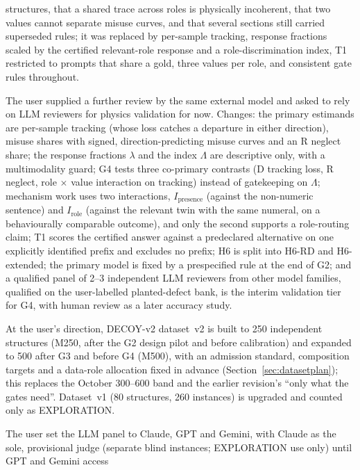 \documentclass[10pt,a4paper]{article}
\begin{document}
\begin{description}
structures, that a shared trace across roles is physically incoherent, that two values cannot separate misuse
curves, and that several sections still carried superseded rules; it was replaced by per-sample tracking, response
fractions scaled by the certified relevant-role response and a role-discrimination index, T1 restricted to
prompts that share a gold, three values per role, and consistent gate rules throughout.
\item[11 November 2026, refinements after a second external review.] The user supplied a further review by the same
external model and asked to rely on LLM reviewers for physics validation for now. Changes: the primary estimands
are per-sample tracking (whose loss catches a departure in either direction), misuse shares with signed,
direction-predicting misuse curves and an R neglect share; the response fractions $\lambda$ and the index $\Lambda$
are descriptive only, with a multimodality guard; G4 tests three co-primary contrasts (D tracking loss, R neglect,
role $\times$ value interaction on tracking) instead of gatekeeping on $\Lambda$; mechanism work uses two
interactions, $I_{\text{presence}}$ (against the non-numeric sentence) and $I_{\text{role}}$ (against the relevant
twin with the same numeral, on a behaviourally comparable outcome), and only the second supports a role-routing
claim; T1 scores the certified answer against a predeclared alternative on one explicitly identified prefix and
excludes no prefix; H6 is split into H6-RD and H6-extended; the primary model is fixed by a prespecified rule at the
end of G2; and a qualified panel of 2--3 independent LLM reviewers from other model families, qualified on the
user-labelled planted-defect bank, is the interim validation tier for G4, with human review as a later accuracy
study.
\item[11 November 2026, dataset size.] At the user's direction, DECOY-v2 dataset~v2 is built to 250 independent
structures (M250, after the G2 design pilot and before calibration) and expanded to 500 after G3 and before G4
(M500), with an admission standard, composition targets and a data-role allocation fixed in advance
(Section~\ref{sec:datasetplan}); this replaces the October 300--600 band and the earlier revision's ``only what the
gates need''. Dataset~v1 (80 structures, 260 instances) is upgraded and counted only as EXPLORATION.
\item[12 November 2026, judges and execution authority.] The user set the LLM panel to Claude, GPT and Gemini, with
Claude as the sole, provisional judge (separate blind instances; EXPLORATION use only) until GPT and Gemini access

\end{description}
\end{document}
